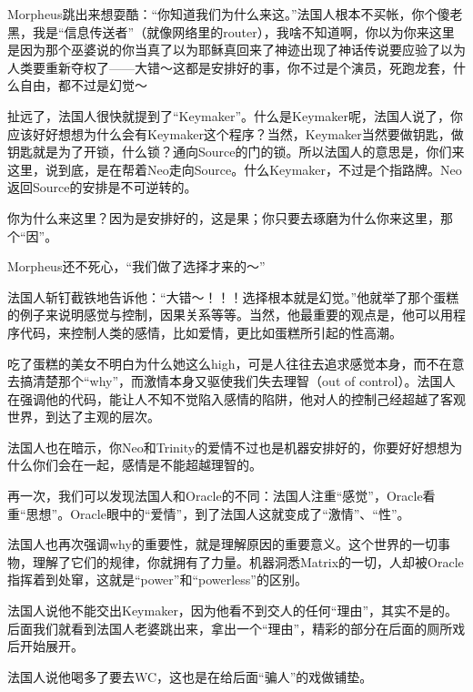 \documentclass{ctexart}
\begin{document}
Morpheus跳出来想耍酷：“你知道我们为什么来这。”法国人根本不买帐，你个傻老黑，我是“信息传送者”（就像网络里的router），我啥不知道啊，你以为你来这里是因为那个巫婆说的你当真了以为耶稣真回来了神迹出现了神话传说要应验了以为人类要重新夺权了——大错～这都是安排好的事，你不过是个演员，死跑龙套，什么自由，都不过是幻觉～

扯远了，法国人很快就提到了“Keymaker”。什么是Keymaker呢，法国人说了，你应该好好想想为什么会有Keymaker这个程序？当然，Keymaker当然要做钥匙，做钥匙就是为了开锁，什么锁？通向Source的门的锁。所以法国人的意思是，你们来这里，说到底，是在帮着Neo走向Source。什么Keymaker，不过是个指路牌。Neo返回Source的安排是不可逆转的。

你为什么来这里？因为是安排好的，这是果；你只要去琢磨为什么你来这里，那个“因”。

Morpheus还不死心，“我们做了选择才来的～”

法国人斩钉截铁地告诉他：“大错～！！！选择根本就是幻觉。”他就举了那个蛋糕的例子来说明感觉与控制，因果关系等等。当然，他最重要的观点是，他可以用程序代码，来控制人类的感情，比如爱情，更比如蛋糕所引起的性高潮。

吃了蛋糕的美女不明白为什么她这么high，可是人往往去追求感觉本身，而不在意去搞清楚那个“why”，而激情本身又驱使我们失去理智（out of control）。法国人在强调他的代码，能让人不知不觉陷入感情的陷阱，他对人的控制己经超越了客观世界，到达了主观的层次。

法国人也在暗示，你Neo和Trinity的爱情不过也是机器安排好的，你要好好想想为什么你们会在一起，感情是不能超越理智的。

再一次，我们可以发现法国人和Oracle的不同：法国人注重“感觉”，Oracle看重“思想”。Oracle眼中的“爱情”，到了法国人这就变成了“激情”、“性”。

法国人也再次强调why的重要性，就是理解原因的重要意义。这个世界的一切事物，理解了它们的规律，你就拥有了力量。机器洞悉Matrix的一切，人却被Oracle指挥着到处窜，这就是“power”和“powerless”的区别。

法国人说他不能交出Keymaker，因为他看不到交人的任何“理由”，其实不是的。后面我们就看到法国人老婆跳出来，拿出一个“理由”，精彩的部分在后面的厕所戏后开始展开。

法国人说他喝多了要去WC，这也是在给后面“骗人”的戏做铺垫。
\end{document}
